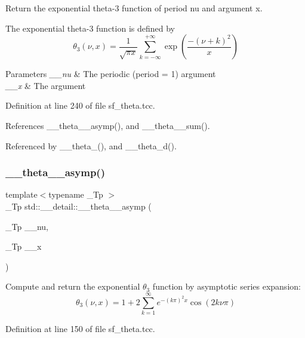 Return the exponential theta-\/3 function of period {\ttfamily nu} and argument {\ttfamily x}.

The exponential theta-\/3 function is defined by \[ \theta_3(\nu,x) = \frac{1}{\sqrt{\pi x}} \sum_{k=-\infty}^{+\infty} \exp\left( \frac{-(\nu+k)^2}{x} \right) \]


\begin{DoxyParams}{Parameters}
{\em \+\_\+\+\_\+nu} & The periodic (period = 1) argument \\
\hline
{\em \+\_\+\+\_\+x} & The argument \\
\hline
\end{DoxyParams}


Definition at line 240 of file sf\+\_\+theta.\+tcc.



References \+\_\+\+\_\+theta\+\_\+\_\+asymp(), and \+\_\+\+\_\+theta\+\_\+\_\+sum().



Referenced by \+\_\+\+\_\+theta\+\_(), and \+\_\+\+\_\+theta\+\_\+d().

\mbox{\label{namespacestd_1_1____detail_a975a9a52a8a483849dd0877c24ca5d74}} 
\subsubsection{\texorpdfstring{\+\_\+\+\_\+theta\+\_\+\_\+asymp()}{\_\_theta\_3\_asymp()}}
{\footnotesize\ttfamily template$<$typename \+\_\+\+Tp $>$ \\
\+\_\+\+Tp std\+::\+\_\+\+\_\+detail\+::\+\_\+\+\_\+theta\+\_\+\_\+asymp (\begin{DoxyParamCaption}\item[{\+\_\+\+Tp}]{\+\_\+\+\_\+nu,  }\item[{\+\_\+\+Tp}]{\+\_\+\+\_\+x }\end{DoxyParamCaption})}

Compute and return the exponential $ \theta_3 $ function by asymptotic series expansion\+: \[ \theta_3(\nu, x) = 1 + 2\sum_{k=1}^{\infty} e^{-(k\pi)^2 x} \cos(2k\nu\pi) \] 

Definition at line 150 of file sf\+\_\+theta.\+tcc.




